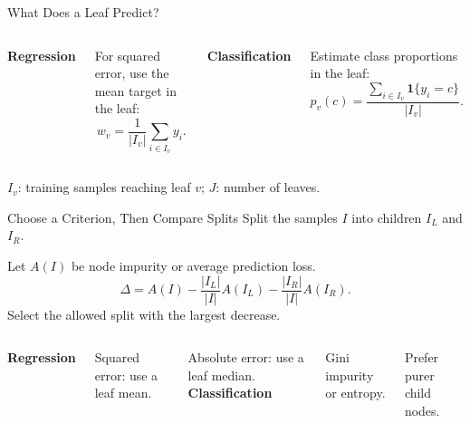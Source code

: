 \begin{frame}{What Does a Leaf Predict?}
	\begin{columns}[T,onlytextwidth]
		{\large\color{slideorange}\textbf{Regression}}
		\vspace{.25cm}
		\par For squared error, use the mean target in the leaf:
		\[w_v=\frac{1}{|I_v|}\sum_{i\in I_v}y_i.\]
		\vspace{.15cm}
		\centering
		{\large\color{slideorange}\textbf{Classification}}
		\vspace{.25cm}
		\par Estimate class proportions in the leaf:
		\[p_v(c)=\frac{\sum_{i\in I_v}\mathbf 1\{y_i=c\}}{|I_v|}.\]
		\vspace{.15cm}
		\centering
	\end{columns}
	\vspace{.6cm}
	$I_v$: training samples reaching leaf $v$; $J$: number of leaves.
\end{frame}

\begin{frame}{Choose a Criterion, Then Compare Splits}
	Split the samples $I$ into children $I_L$ and $I_R$.\par
	Let $A(I)$ be node impurity or average prediction loss.
	\[
	\Delta=A(I)-\frac{|I_L|}{|I|}A(I_L)-\frac{|I_R|}{|I|}A(I_R).
	\]
	\centering Select the allowed split with the largest decrease.
	\pause
	\vspace{.45cm}
	\begin{columns}[T,onlytextwidth]
		{\large\color{slideorange}\textbf{Regression}}\par
		\vspace{.2cm}
		Squared error: use a leaf mean.\par
		\vspace{.2cm}
		Absolute error: use a leaf median.
		{\large\color{slideorange}\textbf{Classification}}\par
		\vspace{.2cm}
		Gini impurity or entropy.\par
		\vspace{.2cm}
		Prefer purer child nodes.
	\end{columns}
\end{frame}


